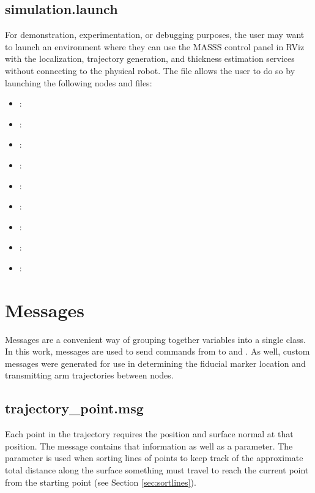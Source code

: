\subsection{simulation.launch}

For demonstration, experimentation, or debugging purposes, the user may want to launch an environment where they can use the MASSS control panel in RViz with the localization, trajectory generation, and thickness estimation services without connecting to the physical robot. The  file allows the user to do so by launching the following nodes and files:

\begin{itemize}

\item {} : 
\item {} : 
\item {} : 
\item {} : 
\item {} : 
\item {} : 
\item {} : 
\item {} : 
\item {} : 
\end{itemize}

\section{Messages}

Messages are a convenient way of grouping together variables into a single class. In this work, messages are used to send commands from  to  and . As well, custom messages were generated for use in determining the fiducial marker location and transmitting arm trajectories between nodes.\\

\subsection{trajectory\_point.msg}
Each point in the trajectory requires the position and surface normal at that position. The  message contains that information as well as a  parameter. The  parameter is used when sorting lines of points to keep track of the approximate total distance along the surface something must travel to reach the current point from the starting point (see Section \ref{sec:sortlines}).\\
